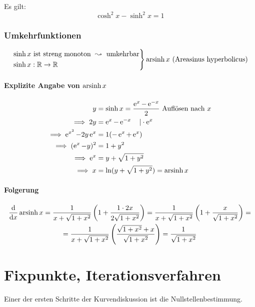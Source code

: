 
Es gilt:
\begin{equation*}
	\cosh^2 x - \sinh^2 x = 1
\end{equation*}

\subsubsection*{Umkehrfunktionen}

\begin{equation*}
	\left.
	\begin{aligned}
		&\sinh x \text{ ist streng monoton } \leadsto \text{ umkehrbar} \\
		&\sinh x : \mathbb{R} \rightarrow \mathbb{R}
	\end{aligned}
	\right\} \operatorname{arsinh} x \text{ (Areasinus hyperbolicus)}
\end{equation*}

\paragraph{Explizite Angabe von $\operatorname{arsinh} x$}
\begin{align*}
	y &= \sinh x = \frac{\operatorname{e}^x - \operatorname{e}^{-x}}{2} \text{ Auflösen nach $x$}\\
	\implies 2y &= \operatorname{e}^x - \operatorname{e}^{-x} \quad| \cdot \operatorname{e}^x \\
	\implies \operatorname{e}^{x^2} - 2y\operatorname{e}^x &= 1(-\operatorname{e}^x + \operatorname{e}^x) \\
	\implies (\operatorname{e}^x - y)^2 &= 1 + y^2 \\
	\implies \operatorname{e}^x &= y + \sqrt{1 + y^2} \\
	\implies x &= \ln (y + \sqrt{1 + y^2}) = \operatorname{arsinh} x
\end{align*}

\paragraph{Folgerung}
\begin{multline*}
	\frac{\mathrm d}{\mathrm d x} \operatorname{arsinh} x = \frac{1}{x + \sqrt{1 + x^2}}\left(1 + \frac{1 \cdot 2x}{2\sqrt{1 + x^2}}\right) = \frac{1}{x + \sqrt{1 + x^2}} \left(1 + \frac{x}{\sqrt{1 + x^2}} \right) = \\
	= \frac{1}{x + \sqrt{1 + x^2}} \left(\frac{\sqrt{1 + x^2} + x}{\sqrt{1 + x^2}}\right) = \frac{1}{\sqrt{1 + x^2}}
\end{multline*}

\section{Fixpunkte, Iterationsverfahren}
Einer der ersten Schritte der Kurvendiskussion ist die Nullstellenbestimmung.

